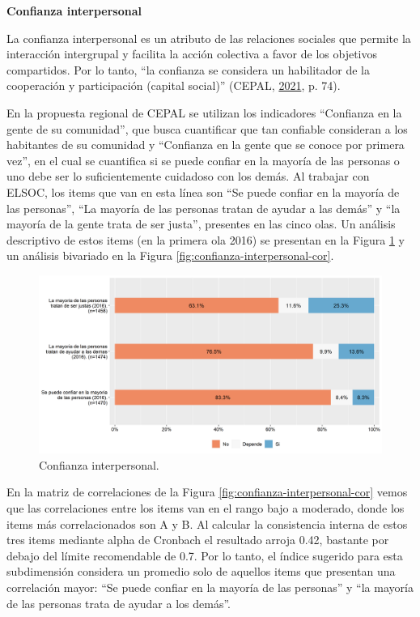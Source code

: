 \documentclass[
  12pt,
]{book}
\begin{document}
\textbf{Confianza interpersonal}

La confianza interpersonal es un atributo de las relaciones sociales que permite la interacción intergrupal y facilita la acción colectiva a favor de los objetivos compartidos. Por lo tanto, ``la confianza se considera un habilitador de la cooperación y participación (capital social)'' (CEPAL, \protect\hyperlink{ref-cepal_cohesion_2021}{2021}, p. 74).

En la propuesta regional de CEPAL se utilizan los indicadores ``Confianza en la gente de su comunidad'', que busca cuantificar que tan confiable consideran a los habitantes de su comunidad y ``Confianza en la gente que se conoce por primera vez'', en el cual se cuantifica si se puede confiar en la mayoría de las personas o uno debe ser lo suficientemente cuidadoso con los demás. Al trabajar con ELSOC, los items que van en esta línea son ``Se puede confiar en la mayoría de las personas'', ``La mayoría de las personas tratan de ayudar a las demás'' y ``la mayoría de la gente trata de ser justa'', presentes en las cinco olas. Un análisis descriptivo de estos items (en la primera ola 2016) se presentan en la Figura \ref{fig:confianza-interpersonal} y un análisis bivariado en la Figura \ref{fig:confianza-interpersonal-cor}.

\begin{figure}[H]

{\centering \includegraphics[width=1\linewidth,height=1\textheight]{output/graphs/confianza-interpersonal} 

}

\caption{Confianza interpersonal.}\label{fig:confianza-interpersonal}
\end{figure}

En la matriz de correlaciones de la Figura \ref{fig:confianza-interpersonal-cor} vemos que las correlaciones entre los items van en el rango bajo a moderado, donde los items más correlacionados son A y B. Al calcular la consistencia interna de estos tres items mediante alpha de Cronbach el resultado arroja 0.42, bastante por debajo del límite recomendable de 0.7. Por lo tanto, el índice sugerido para esta subdimensión considera un promedio solo de aquellos items que presentan una correlación mayor: ``Se puede confiar en la mayoría de las personas'' y ``la mayoría de las personas trata de ayudar a los demás''.
\end{document}
